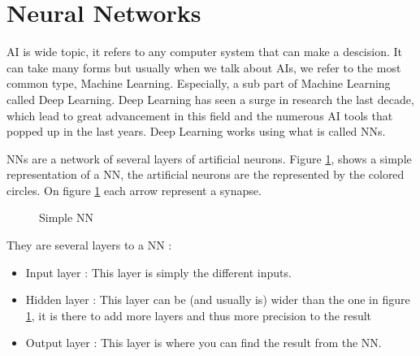 \section{Neural Networks}\label{sec:nn}

\ac{AI} is wide topic, it refers to any computer system that can make a descision. It can take many forms but usually when we talk about \acp{AI}, we refer to the most common type, Machine Learning. Especially, a sub part of Machine Learning called Deep Learning. Deep Learning has seen a surge in research the last decade, which lead to great advancement in this field and the numerous \ac{AI} tools that popped up in the last years.
Deep Learning works using what is called \acp{NN}.

\acfp{NN} are a network of several layers of artificial neurons. Figure \ref{fig:snn}, shows a simple representation of a \ac{NN}, the artificial neurons are the represented by the colored circles. On figure \ref{fig:snn} each arrow represent a synapse.

\begin{figure}[h!]
  \centering
  
  \caption{Simple \acl{NN}}
  \label{fig:snn}
\end{figure}



They are several layers to a \ac{NN} :
\begin{itemize}
  \item Input layer : This layer is simply the different inputs.
  \item Hidden layer : This layer can be (and usually is) wider than the one in figure \ref{fig:snn}, it is there to add more layers and thus more precision to the result
  \item Output layer : This layer is where you can find the result from the \ac{NN}.
\end{itemize}

